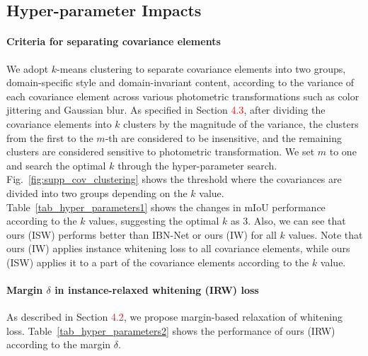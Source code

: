 \documentclass[final]{latex/cvpr}
\newcommand{\todow}[1]{\textcolor{red}{#1}}
\begin{document}
\vspace{-0.0cm}
\subsection{Hyper-parameter Impacts}
\vspace{-0.05cm}
\paragraph{Criteria for separating covariance elements}
We adopt $k$-means clustering to separate covariance elements into two groups, domain-specific style and domain-invariant content, according to the variance of each covariance element across various photometric transformations such as color jittering and Gaussian blur. As specified in Section \todow{4.3}, after dividing the covariance elements into $k$ clusters by the magnitude of the variance, the clusters from the first to the $m$-th are considered to be insensitive, and the remaining clusters are considered sensitive to photometric transformation. We set $m$ to one and search the optimal $k$ through the hyper-parameter search. Fig.~\ref{fig:supp_cov_clustering} shows the threshold where the covariances are divided into two groups depending on the $k$ value.
Table~\ref{tab_hyper_parameters1} shows the changes in mIoU performance according to the $k$ values, suggesting the optimal $k$ as 3. Also, we can see that ours (ISW) performs better than IBN-Net or ours (IW) for all $k$ values. Note that ours (IW) applies instance whitening loss to all covariance elements, while ours (ISW) applies it to a part of the covariance elements according to the $k$ value.

\paragraph{Margin $\delta$ in instance-relaxed whitening (IRW) loss}
\vspace*{-0.3cm}
As described in Section \todow{4.2}, we propose margin-based relaxation of whitening loss. Table~\ref{tab_hyper_parameters2} shows the performance of ours (IRW) according to the margin $\delta$.
\end{document}

